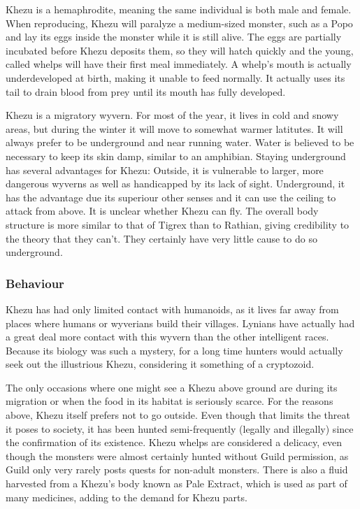 Khezu is a hemaphrodite, meaning the same individual is both male and female. When reproducing, Khezu will paralyze a medium-sized monster, such as a Popo and lay its eggs inside the monster while it is still alive. The eggs are partially incubated before Khezu deposits them, so they will hatch quickly and the young, called whelps will have their first meal immediately. A whelp's mouth is actually underdeveloped at birth, making it unable to feed normally. It actually uses its tail to drain blood from prey until its mouth has fully developed.

Khezu is a migratory wyvern. For most of the year, it lives in cold and snowy areas, but during the winter it will move to somewhat warmer latitutes. It will always prefer to be underground and near running water. Water is believed to be necessary to keep its skin damp, similar to an amphibian. Staying underground has several advantages for Khezu: Outside, it is vulnerable to larger, more dangerous wyverns as well as handicapped by its lack of sight. Underground, it has the advantage due its superiour other senses and it can use the ceiling to attack from above. It is unclear whether Khezu can fly. The overall body structure is more similar to that of Tigrex than to Rathian, giving credibility to the theory that they can't. They certainly have very little cause to do so underground.

\subsubsection{Behaviour}
Khezu has had only limited contact with humanoids, as it lives far away from places where humans or wyverians build their villages. Lynians have actually had a great deal more contact with this wyvern than the other intelligent races. Because its biology was such a mystery, for a long time hunters would actually seek out the illustrious Khezu, considering it something of a cryptozoid.

The only occasions where one might see a Khezu above ground are during its migration or when the food in its habitat is seriously scarce. For the reasons above, Khezu itself prefers not to go outside. Even though that limits the threat it poses to society, it has been hunted semi-frequently (legally and illegally) since the confirmation of its existence. Khezu whelps are considered a delicacy, even though the monsters were almost certainly hunted without Guild permission, as Guild only very rarely posts quests for non-adult monsters. There is also a fluid harvested from a Khezu's body known as Pale Extract, which is used as part of many medicines, adding to the demand for Khezu parts.


